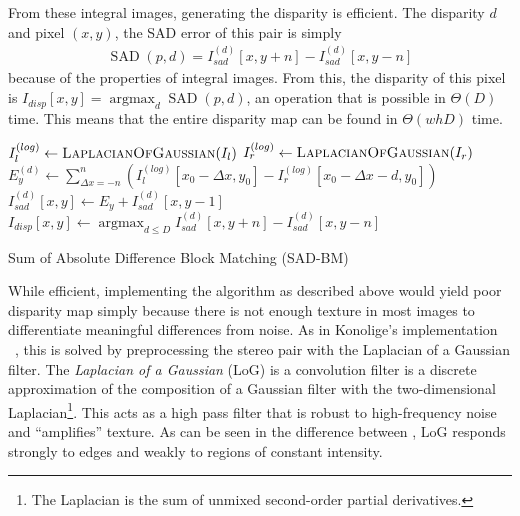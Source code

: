 \documentclass{article}
\newcommand{\proc}[1]{\textnormal{\scshape#1}}
\DeclareMathOperator*{\argmin}{argmax}
\DeclareMathOperator{\LoG}{\proc{LaplacianOfGaussian}}
\DeclareMathOperator{\SAD}{SAD}
\begin{document}
From these integral images, generating the disparity is efficient. The
disparity $d$ and pixel $(x, y)$, the SAD error of this pair is simply
\begin{align*}
    \SAD(p, d) = I_{sad}^{(d)}[x, y + n] - I_{sad}^{(d)}[x, y - n]
\end{align*}
because of the properties of integral images. From this, the disparity of this
pixel is $I_{disp}[x, y] = \argmin_{d} \SAD(p, d)$, an operation that is
possible in $\Theta(D)$ time. This means that the entire disparity map can be
found in $\Theta(whD)$ time.

\begin{algorithm}[t]
    $I_l^{(log)} \gets \LoG(I_l)$ \;
    $I_r^{(log)} \gets \LoG(I_r)$ \;
     {
         {
            $E_y^{(d)} \gets \sum_{\Delta x = -n}^n \left(
                          I_l^{(log)}[x_0 - \Delta x, y_0]
                          - I_r^{(log)}[x_0 - \Delta x - d, y_0] \right)$ \;
            $I_{sad}^{(d)}[x, y] \gets E_y + I_{sad}^{(d)}[x, y - 1]$ \;
        }
    }
     {
        $I_{disp}[x, y] \gets \argmin_{d \le D} I_{sad}^{(d)}[x, y + n] - I_{sad}^{(d)}[x, y - n]$ \;
    }
    \caption{Sum of Absolute Difference Block Matching (SAD-BM)}
    \label{alg:serial}
\end{algorithm}

While efficient, implementing the algorithm as described above would yield poor
disparity map simply because there is not enough texture in most images to
differentiate meaningful differences from noise. As in Konolige's
implementation ~\cite{konolige97}, this is solved by preprocessing the stereo
pair with the Laplacian of a Gaussian filter. The \textit{Laplacian of a
Gaussian} (LoG) is a convolution filter is a discrete approximation of the
composition of a Gaussian filter with the two-dimensional
Laplacian\footnote{The Laplacian is the sum of unmixed second-order partial
derivatives.}. This acts as a high pass filter that is robust to high-frequency
noise and ``amplifies'' texture. As can be seen in the difference between
, LoG responds strongly to edges and
weakly to regions of constant intensity.
\end{document}
